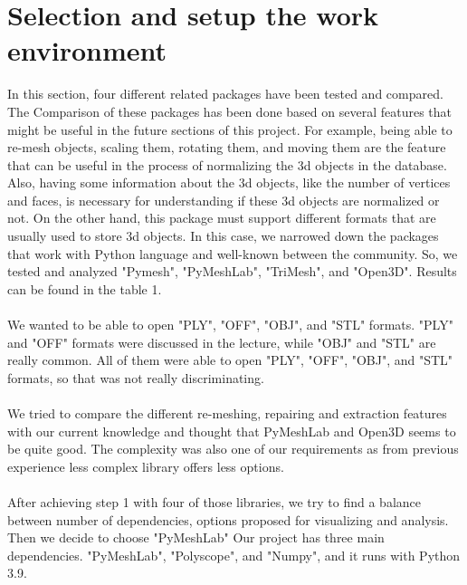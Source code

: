 \documentclass[10pt,twocolumn,letterpaper]{article}
\begin{document}
\section{Selection and setup the work environment}
In this section, four different related packages have been tested and compared. The Comparison of these packages has been done based on several features that might be useful in the future sections of this project. For example, being able to re-mesh objects, scaling them, rotating them, and moving them are the feature that can be useful in the process of normalizing the 3d objects in the database. Also, having some information about the 3d objects, like the number of vertices and faces, is necessary for understanding if these 3d objects are normalized or not. On the other hand, this package must support different formats that are usually used to store 3d objects.
In this case, we narrowed down the packages that work with Python language and well-known between the community. So, we tested and analyzed "Pymesh", "PyMeshLab", "TriMesh", and "Open3D". Results can be found in the table 1.\\ \\
We wanted to be able to open "PLY", "OFF", "OBJ", and "STL" formats. "PLY" and "OFF" formats were discussed in the lecture, while "OBJ" and "STL" are really common. All of them were able to open "PLY", "OFF", "OBJ", and "STL" formats, so that was not really discriminating. \\ \\
	We tried to compare the different re-meshing, repairing and extraction features with our current knowledge and thought that PyMeshLab and Open3D seems to be quite good. The complexity was also one of our requirements as from previous experience less complex library offers less options. \\ \\
	After achieving step 1 with four of those libraries, we try to find a balance between number of dependencies, options proposed for visualizing and analysis. Then we decide to choose "PyMeshLab"\cite{pymeshlab}
Our project has three main dependencies. "PyMeshLab", "Polyscope", and "Numpy", and it runs with Python 3.9. \\ 
\end{document}
